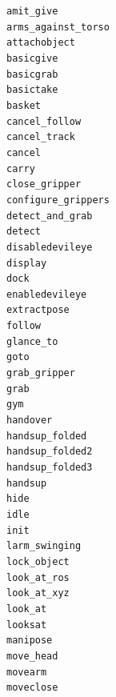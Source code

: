 \documentclass[compress]{beamer}
\begin{document}
{{{\begin{frame}{}
\begin{multicols}{4}
{\tt amit\_give} \\
{\tt arms\_against\_torso} \\
{\tt attachobject} \\
{\tt basicgive} \\
{\tt basicgrab} \\
{\tt basictake} \\
{\tt basket} \\
{\tt cancel\_follow} \\
{\tt cancel\_track} \\
{\tt cancel} \\
{\tt carry} \\
{\tt close\_gripper} \\
{\tt configure\_grippers} \\
{\tt detect\_and\_grab} \\
{\tt detect} \\
{\tt disabledevileye} \\
{\tt display} \\
{\tt dock} \\
{\tt enabledevileye} \\
{\tt extractpose} \\
{\tt follow} \\
{\tt glance\_to} \\
{\tt goto} \\
{\tt grab\_gripper} \\
{\tt grab} \\
{\tt gym} \\
{\tt handover} \\
{\tt handsup\_folded} \\
{\tt handsup\_folded2} \\
{\tt handsup\_folded3} \\
{\tt handsup} \\
{\tt hide} \\
{\tt idle} \\
{\tt init} \\
{\tt larm\_swinging} \\
{\tt lock\_object} \\
{\tt look\_at\_ros} \\
{\tt look\_at\_xyz} \\
{\tt look\_at} \\
{\tt looksat} \\
{\tt manipose} \\
{\tt move\_head} \\
{\tt movearm} \\
{\tt moveclose} \\

\end{multicols}
\end{frame}}}}
\end{document}
